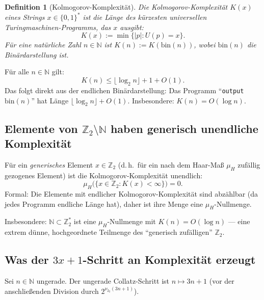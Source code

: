 \documentclass[12pt,a4paper]{article}
\newtheorem{definition}{Definition}[section]
\newcommand{\vii}{\nu_2}
\newcommand{\N}{\mathbb{N}}
\newcommand{\Ztwo}{\mathbb{Z}_2}
\newcommand{\KC}{K}    %
\begin{document}
\begin{definition}[Kolmogorov-Komplexität]
Die \emph{Kolmogorov-Komplexität} $\KC(x)$ eines Strings $x \in \{0,1\}^*$
ist die Länge des kürzesten universellen Turingmaschinen-Programms, das
$x$ ausgibt:
\[
  \KC(x) := \min\{|p| : U(p) = x\}.
\]
Für eine natürliche Zahl $n \in \N$ ist $\KC(n) := \KC(\mathrm{bin}(n))$,
wobei $\mathrm{bin}(n)$ die Binärdarstellung ist.
\end{definition}

\begin{tcolorbox}[ergebnis, title={Komplexität natürlicher Zahlen (Standard)}]
Für alle $n \in \N$ gilt:
\[
  \KC(n) \leq \lfloor\log_2 n\rfloor + 1 + O(1).
\]
Das folgt direkt aus der endlichen Binärdarstellung: Das Programm
``\texttt{output }$\mathrm{bin}(n)$'' hat Länge $\lfloor\log_2 n\rfloor + O(1)$.
Insbesondere: $\KC(n) = O(\log n)$.
\end{tcolorbox}

\subsection{Elemente von \texorpdfstring{$\Ztwo \setminus \N$}{Z2 ohne N}
haben generisch unendliche Komplexität}

\begin{tcolorbox}[adisch, title={Generische Komplexität in $\Ztwo$}]
Für ein \emph{generisches} Element $x \in \Ztwo$ (d.\,h.\ für ein nach
dem Haar-Maß $\mu_H$ zufällig gezogenes Element) ist die Kolmogorov-Komplexität
unendlich:
\[
  \mu_H\bigl(\{x \in \Ztwo : \KC(x) < \infty\}\bigr) = 0.
\]
Formal: Die Elemente mit endlicher Kolmogorov-Komplexität sind abzählbar
(da jedes Programm endliche Länge hat), daher ist ihre Menge eine
$\mu_H$-Nullmenge.

\medskip
Insbesondere: $\N \subset \Ztwo^*$ ist eine $\mu_H$-Nullmenge mit
$\KC(n) = O(\log n)$ --- eine extrem dünne, hochgeordnete Teilmenge
des ``generisch zufälligen'' $\Ztwo$.
\end{tcolorbox}

\subsection{Was der $3x+1$-Schritt an Komplexität erzeugt}

Sei $n \in \N$ ungerade. Der ungerade Collatz-Schritt ist $n \mapsto 3n+1$
(vor der anschließenden Division durch $2^{\vii_2(3n+1)}$).
\end{document}
